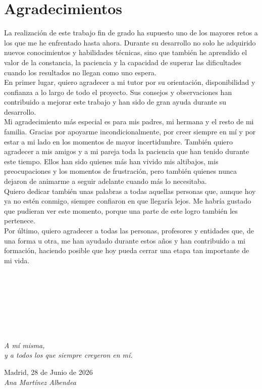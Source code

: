 \cleardoublepage

\chapter*{Agradecimientos}

La realización de este trabajo fin de grado ha supuesto uno de los mayores retos a los que me he enfrentado hasta ahora. Durante su desarrollo no solo he adquirido nuevos conocimientos y habilidades técnicas, sino que también he aprendido el valor de la constancia, la paciencia y la capacidad de superar las dificultades cuando los resultados no llegan como uno espera.\\

En primer lugar, quiero agradecer a mi tutor por su orientación, disponibilidad y confianza a lo largo de todo el proyecto. Sus consejos y observaciones han contribuido a mejorar este trabajo y han sido de gran ayuda durante su desarrollo.\\

Mi agradecimiento más especial es para mis padres, mi hermana y el resto de mi familia. Gracias por apoyarme incondicionalmente, por creer siempre en mí y por estar a mi lado en los momentos de mayor incertidumbre. También quiero agradecer a mis amigos y a mi pareja toda la paciencia que han tenido durante este tiempo. Ellos han sido quienes más han vivido mis altibajos, mis preocupaciones y los momentos de frustración, pero también quienes nunca dejaron de animarme a seguir adelante cuando más lo necesitaba.\\

Quiero dedicar también unas palabras a todas aquellas personas que, aunque hoy ya no estén conmigo, siempre confiaron en que llegaría lejos. Me habría gustado que pudieran ver este momento, porque una parte de este logro también les pertenece.\\

Por último, quiero agradecer a todas las personas, profesores y entidades que, de una forma u otra, me han ayudado durante estos años y han contribuido a mi formación, haciendo posible que hoy pueda cerrar una etapa tan importante de mi vida.
\ %

\

\

\

\

\begin{flushright}
		\vspace{4.0 cm}
		\emph{A mí misma,\\
y a todos los que siempre creyeron en mí.}\\
		\par
		\vspace{1.0 cm}
		Madrid, 28 de Junio de 2026\\ %
		\emph{Ana Martínez Albendea}
\end{flushright}

\thispagestyle{empty}

